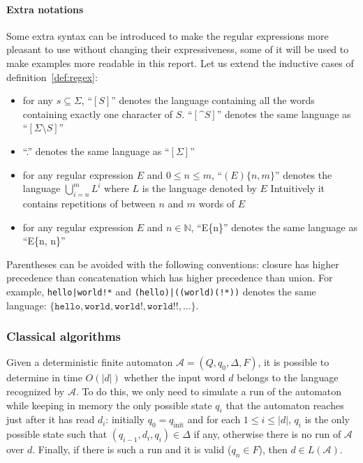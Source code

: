 \documentclass[12px]{article}
\theoremstyle{definition}
\begin{document}
        \paragraph{Extra notations}
          Some extra syntax can be introduced to make the regular expressions
          more pleasant to use without changing their expressiveness, some of
          it will be used to make examples more readable in this report. Let us
          extend the inductive cases of definition~\ref{def:regex}:
            \begin{itemize}
              \item for any $s \subseteq \Sigma$, ``$[S]$'' denotes the
                language containing all the words containing exactly one
                character of $S$.  ``$[\texttt{\textasciicircum}S]$'' denotes
                the same language as ``$[\Sigma \setminus S]$''
              \item ``.'' denotes the same language as ``$[\Sigma]$''
              \item for any regular expression $E$ and $0 \leq n \leq m$,
                ``$(E)\{n,m\}$'' denotes the language $\bigcup_{i=n}^m
                L^i$ where $L$ is the language denoted by $E$ Intuitively it
                contains repetitions of between $n$ and $m$ words of $E$
              \item for any regular expression $E$ and $n \in \mathbb{N}$,
                ``E\{n\}'' denotes the same language as ``E\{n, n\}''
            \end{itemize}

          Parentheses can be avoided with the following conventions: closure
          has higher precedence than concatenation which has higher precedence
          than union. For example, \texttt{hello|world!*} and
          \texttt{(hello)|((world)(!*))} denotes the same language:
          $\{\texttt{hello}, \texttt{world}, \texttt{world!}, \texttt{world!!},
          \ldots\}$.


      \subsubsection{Classical algorithms}

        Given a deterministic finite automaton $\mathcal{A} = (Q, q_0, \Delta,
        F)$, it is possible to determine in time $O(|d|)$ whether the input
        word $d$ belongs to the language recognized by $\mathcal{A}$. To do
        this, we only need to simulate a run of the automaton while keeping in
        memory the only possible state $q_i$ that the automaton reaches just
        after it has read $d_i$: initially $q_0 = q_\text{init}$ and for each
        $1 \leq i \leq |d|$, $q_{i}$ is the only possible state such that
        $(q_{i-1}, d_i, q_i) \in \Delta$ if any, otherwise there is no run of
        $\mathcal{A}$ over $d$. Finally, if there is such a run and it is valid
        ($q_n \in F$), then $d \in L(\mathcal{A})$.
\end{document}
